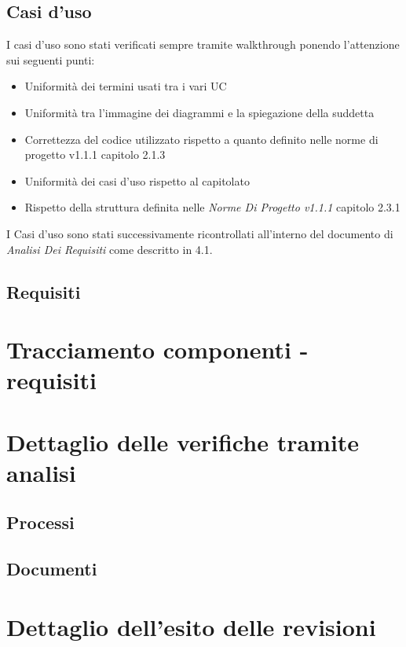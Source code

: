 \documentclass[a4paper]{report}
\begin{document}
			\subsection{Casi d'uso}
				I casi d'uso sono stati verificati sempre tramite walkthrough ponendo l'attenzione sui seguenti punti:
				\begin{itemize}
					\item Uniformità dei termini usati tra i vari UC
					\item Uniformità tra l'immagine dei diagrammi e la spiegazione della suddetta
					\item Correttezza del codice utilizzato rispetto a quanto definito nelle norme di progetto v1.1.1 capitolo
					2.1.3
					\item Uniformità dei casi d'uso rispetto al capitolato
					\item Rispetto della struttura definita nelle \emph{Norme Di Progetto v1.1.1} capitolo 2.3.1
				\end{itemize}

				I Casi d'uso sono stati successivamente ricontrollati all'interno del documento di \emph{Analisi Dei Requisiti} come
				descritto in 4.1.
			\subsection{Requisiti}
				
		\section{Tracciamento componenti - requisiti}
		
		\section{Dettaglio delle verifiche tramite analisi}
			\subsection{Processi}
			\subsection{Documenti}
		\section{Dettaglio dell'esito delle revisioni}
	
\end{document}

